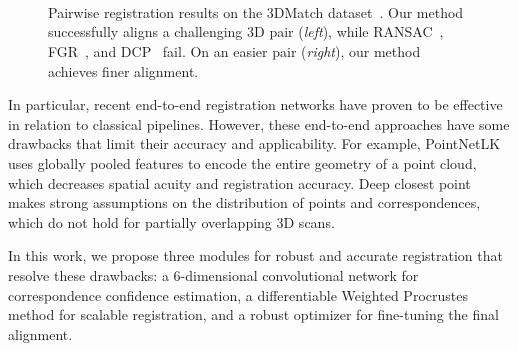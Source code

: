 \documentclass[10pt,twocolumn,letterpaper]{article}
\begin{document}
\begin{figure}[t]
    \small 
    \centering
    \\
    \vspace{-1.5em}
    \\
    \vspace{-1.5em}
    \\
    \vspace{-1.5em}
  \vspace{-0.5em}
  \caption{Pairwise registration results on the 3DMatch dataset~\cite{zeng20163dmatch}. Our method successfully aligns a challenging 3D pair (\textit{left}), while RANSAC~\cite{rusu2009icra}, FGR~\cite{zhou2016eccv}, and DCP~\cite{wang2019deep} fail. On an easier pair (\textit{right}), our method achieves finer alignment.}
  \label{fig:teaser}
  \vspace{-1.5em}
\end{figure}

In particular, recent end-to-end registration networks have proven to be effective in relation to classical pipelines.
However, these end-to-end approaches have some drawbacks that limit their accuracy and applicability.
For example, PointNetLK~\cite{aoki2019pointnetlk} uses globally pooled features to encode the entire geometry of a point cloud, which decreases spatial acuity and registration accuracy.
Deep closest point~\cite{wang2019deep} makes strong assumptions on the distribution of points and correspondences, which do not hold for partially overlapping 3D scans.

In this work, we propose three modules for robust and accurate registration that resolve these drawbacks: a 6-dimensional convolutional network for correspondence confidence estimation, a differentiable Weighted Procrustes method for scalable registration, and a robust  optimizer for fine-tuning the final alignment.
\end{document}
